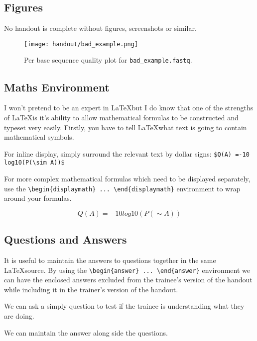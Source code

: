 \subsection{Figures}

No handout is complete without figures, screenshots or similar.

\begin{figure}[H]
\centering
\texttt{[image: handout/bad\_example.png]}
\caption{Per base sequence quality plot for \texttt{bad\_example.fastq}.}
\label{fig:bad_example_untrimmed_plot}
\end{figure}

\subsection{Maths Environment}

I won't pretend to be an expert in \LaTeX but I do know that one of the strengths of \LaTeX is it's
ability to allow mathematical formulas to be constructed and typeset very easily. Firstly, you have
to tell \LaTeX what text is going to contain mathematical symbols.

For inline display, simply surround the relevant text by dollar signs: \verb+$Q(A) =-10 log10(P(\sim A))$+

For more complex mathematical formulas which need to be displayed separately, use the
\verb+\begin{displaymath} ... \end{displaymath}+ environment to wrap around your formulas.

\begin{displaymath}
Q(A) =-10 log10(P(\sim A))
\end{displaymath} 


\subsection{Questions and Answers}

It is useful to maintain the answers to questions together in the same \LaTeX source. By using the
\verb+\begin{answer} ... \end{answer}+ environment we can have the enclosed answers excluded from
the trainee's version of the handout while including it in the trainer's version of the handout.

\begin{questions}
We can ask a simply question to test if the trainee is understanding what they are doing. 
\begin{answer}
We can maintain the answer along side the questions.
\end{answer}

\end{questions}

